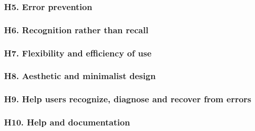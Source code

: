 \subsubsection{H5. Error prevention }
\subsubsection{H6. Recognition rather than recall}
\subsubsection{H7. Flexibility and efficiency of use}
\subsubsection{H8. 	Aesthetic and minimalist design}
\subsubsection{H9. Help users recognize, diagnose and recover from errors}
\subsubsection{H10. Help and documentation }
 	 	 
	 
 	 
 	 
 	 
 	 




